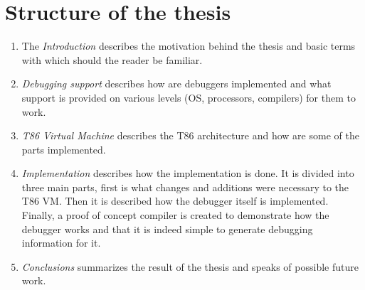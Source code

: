 \section{Structure of the thesis}
\begin{enumerate}
    \item The \textit{Introduction} describes the motivation behind the thesis
        and basic terms with which should the reader be familiar.
    \item \textit{Debugging support} describes how are debuggers implemented
        and what support is provided on various levels (OS, processors,
        compilers) for them to work.
    \item \textit{T86 Virtual Machine} describes the T86 architecture and how
        are some of the parts implemented.
    \item \textit{Implementation} describes how the implementation is done. It
        is divided into three main parts, first is what changes and additions
        were necessary to the T86 VM. Then it is described how the debugger
        itself is implemented. Finally, a proof of concept compiler is created
        to demonstrate how the debugger works and that it is indeed simple to
        generate debugging information for it.
    \item \textit{Conclusions} summarizes the result of the thesis and speaks
        of possible future work.
\end{enumerate}
